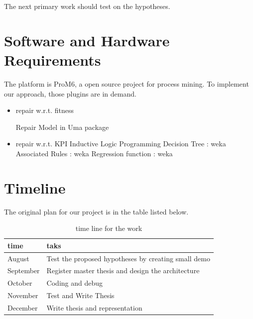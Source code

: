 \documentclass[12pt, a4paper]{article}
\begin{document}
The next primary work should test on the hypotheses. 


\section*{Software and Hardware Requirements}

The platform is ProM6, a open source project for process mining. To implement our approach, those plugins are in demand. 
\begin{itemize}
	
	\item  repair w.r.t. fitness 
	
	   Repair Model in Uma package
	\item repair w.r.t. KPI
	   \subitem	   Inductive Logic Programming
	   \subitem	   Decision Tree : weka
	   \subitem	   Associated Rules : weka
	   \subitem    Regression function : weka
\end{itemize}


\section*{Timeline}
The original plan for our project is in the table listed below.
\begin{table}[h!]
	\caption{ time line for the work}
\begin{tabular}{|l|l|}
	\hline time & taks \\
\hline August &
Test the proposed hypotheses by creating small demo \\
\hline September &
Register master thesis and design the architecture \\
\hline October &
Coding and debug \\
\hline November &
 Test and Write Thesis \\
\hline December &
Write thesis and representation \\
\hline
\end{tabular}
\end{table}
\end{document}
